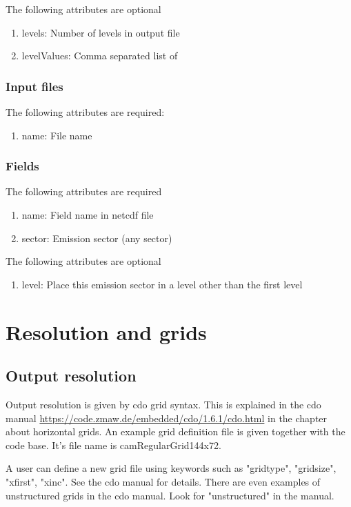\documentclass[12pt]{article}
\begin{document}
The following attributes are optional
\begin{enumerate}
\item levels: Number of levels in output file
\item levelValues: Comma separated list of 
\end{enumerate}

\subsubsection{Input files}

The following attributes are required:
\begin{enumerate}
\item name: File name
\end{enumerate}

\subsubsection{Fields}

The following attributes are required
\begin{enumerate}
\item name: Field name in netcdf file
\item sector: Emission sector (any sector)
\end{enumerate}

The following attributes are optional
\begin{enumerate}
\item level: Place this emission sector in a level other than the first level
\end{enumerate}

\section{Resolution and grids}

\subsection{Output resolution}
Output resolution is given by cdo grid syntax. This is explained in the cdo manual \url{https://code.zmaw.de/embedded/cdo/1.6.1/cdo.html}
in the chapter about horizontal grids. An example grid definition file is given together with the code base. It's file name is camRegularGrid144x72.

A user can define a new grid file using keywords such as "gridtype", "gridsize", "xfirst", "xinc". See the cdo manual for details. There
are even examples of unstructured grids in the cdo manual. Look for "unstructured" in the manual.
\end{document}
